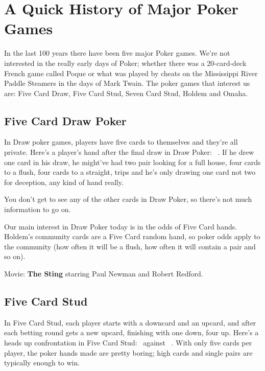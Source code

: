 \chapter{A Quick History of Major Poker Games}

In the last 100 years there have been five major Poker games. We're
not interested in the really early days of Poker; whether there was a
20-card-deck French game called Poque or what was played by cheats on
the Mississippi River Paddle Steamers in the days of Mark
Twain. The poker games that interest us are: Five Card Draw, Five Card
Stud, Seven Card Stud, Holdem and Omaha.


\section{Five Card Draw Poker}

In Draw poker games, players have five cards to themselves and they're
all private. Here's a player's hand after the final draw in Draw
Poker: \back\back\back\back\back\ . If he drew one card in his draw,
he might've had two pair looking for a full house, four cards to a
flush, four cards to a straight, trips and he's only drawing one card
not two for deception, any kind of hand really.

You don't get to see any of the other cards in Draw Poker, so there's
not much information to go on.

Our main interest in Draw Poker today is in the odds of Five Card
hands. Holdem's community cards are a Five Card random hand, so poker
odds apply to the community (how often it will be a flush, how often
it will contain a pair and so on).

Movie: \textbf{The Sting} starring Paul Newman and Robert Redford.

\section{Five Card Stud}

In Five Card Stud, each player starts with a downcard and an upcard,
and after each betting round gets a new upcard, finishing with one
down, four up. Here's a heads up confrontation in Five Card Stud:
\back\nines\Qc\Jc\tred\ against \back\fourh\Jh\tend\trec\ . With
only five cards per player, the poker hands made are pretty boring;
high cards and single pairs are typically enough to win.

